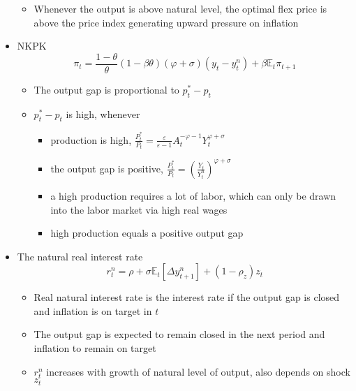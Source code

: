 \documentclass[a4paper]{article}
\begin{document}
\begin{itemize}
\begin{itemize}
        \item Whenever the output is above natural level, the optimal flex price is above the price index generating upward pressure on inflation
    \end{itemize}
    \item NKPK
    \[\pi_t=\frac{1-\theta}{\theta}(1-\beta\theta)(\varphi+\sigma)(y_t-y_t^n)+\beta\mathbb{E}_t\pi_{t+1} \]
    \begin{itemize}
        \item The output gap is proportional to $p_t^*-p_t$
        \item $p_t^*-p_t$ is high, whenever
        \begin{itemize}
            \item production is high, $\frac{P_t^*}{P_t}=\frac{\varepsilon}{\varepsilon-1}A_t^{-\varphi-1}Y_t^{\varphi+\sigma}$
            \item the output gap is positive, $\frac{P_t^*}{P_t}=\left(\frac{Y_t}{Y_t^n} \right)^{\varphi+\sigma}$
            \item a high production requires a lot of labor, which can only be drawn into the labor market via high real wages
            \item high production equals a positive output gap
        \end{itemize}
    \end{itemize}
    \item The natural real interest rate
    \[r_t^n=\rho+\sigma\mathbb{E}_t[\Delta y_{t+1}^n]+(1-\rho_z)z_t \]
    \begin{itemize}
        \item Real natural interest rate is the interest rate if the output gap is closed and inflation is on target in $t$
        \item The output gap is expected to remain closed in the next period and inflation to remain on target
        \item $r_t^n$ increases with growth of natural level of output, also depends on shock $z_t$
    \end{itemize}
\end{itemize}
\end{document}
